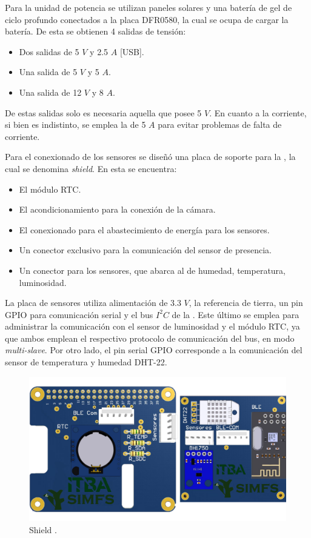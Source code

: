 
Para la unidad de potencia se utilizan paneles solares y una batería de gel de ciclo profundo conectados a la placa DFR0580, la cual se ocupa de cargar la batería. De esta se obtienen 4 salidas de tensión:
\begin{itemize}
	\item Dos salidas de 5 $V$ y 2.5 $A$ [USB].
	\item Una salida de 5 $V$ y 5 $A$.
	\item Una salida de 12 $V$ y 8 $A$.
\end{itemize}
De estas salidas solo es necesaria aquella que posee 5 $V$. En cuanto a la corriente, si bien es indistinto, se emplea la de 5 $A$ para evitar problemas de falta de corriente.

Para el conexionado de los sensores se diseñó una placa de soporte para la \rspi, la cual se denomina \textit{shield}. En esta se encuentra:
\begin{itemize}
	\item El módulo RTC.
	\item El acondicionamiento para la conexión de la cámara.
	\item El conexionado para el abastecimiento de energía para los sensores.
	\item Un conector exclusivo para la comunicación del sensor de presencia.
	\item Un conector para los sensores, que abarca al de humedad, temperatura, luminosidad.
\end{itemize}

La placa de sensores utiliza alimentación de 3.3 $V$, la referencia de tierra, un pin GPIO para comunicación serial y el bus $I^2C$ de la \rpi. Este último se emplea para administrar la comunicación con el sensor de luminosidad y el módulo RTC, ya que ambos emplean el respectivo protocolo de comunicación del bus, en modo \textit{multi-slave}. Por otro lado, el pin serial GPIO corresponde a la comunicación del sensor de temperatura y humedad DHT-22. 
\begin{figure}[H]
	\centering
	\includegraphics[width=0.9\linewidth,page=1]{ImagenesIngenieria de Detalle/RPI}		
	\caption{Shield \rspi.}
	\label{fig:conexionado_Rpi}
\end{figure}

